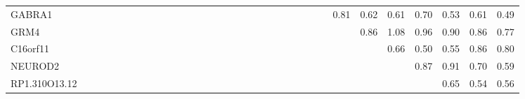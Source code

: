 \begin{longtable}{lrrrrrrrrrrrrrrrrrrrrrrrrrrrrrrrr}
GABRA1        &             &             &            &              &               &                &            &                &             &             &             &             &                    &             &              &               &            &             &              &             &            &              &               &              &              &       0.81 &           0.62 &          0.61 &                0.70 &       0.53 &         0.61 &      0.49 \\
GRM4          &             &             &            &              &               &                &            &                &             &             &             &             &                    &             &              &               &            &             &              &             &            &              &               &              &              &            &           0.86 &          1.08 &                0.96 &       0.90 &         0.86 &      0.77 \\
C16orf11      &             &             &            &              &               &                &            &                &             &             &             &             &                    &             &              &               &            &             &              &             &            &              &               &              &              &            &                &          0.66 &                0.50 &       0.55 &         0.86 &      0.80 \\
NEUROD2       &             &             &            &              &               &                &            &                &             &             &             &             &                    &             &              &               &            &             &              &             &            &              &               &              &              &            &                &               &                0.87 &       0.91 &         0.70 &      0.59 \\
RP1.310O13.12 &             &             &            &              &               &                &            &                &             &             &             &             &                    &             &              &               &            &             &              &             &            &              &               &              &              &            &                &               &                     &       0.65 &         0.54 &      0.56 \\

\end{longtable}
